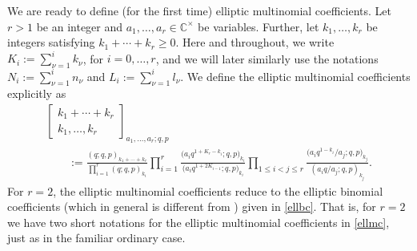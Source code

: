 \documentclass[10pt,a4paper]{amsart}
\numberwithin{equation}{section}
\theoremstyle{definition}
\newcommand{\C}{\mathbb C}
\begin{document}
We are ready to define (for the first time)
elliptic multinomial coefficients.
Let $r>1$ be an integer and $a_1,\dots,a_r\in\C^\times$ be variables.
Further, let $k_1,\dots,k_r$ be integers satisfying $k_1+\cdots+k_r\ge 0$.
Here and throughout, we write $K_i:=\sum_{\nu=1}^i k_\nu$,
for $i=0,\dots,r$, and we will later similarly use the notations
$N_i:=\sum_{\nu=1}^i n_\nu$ and $L_i:=\sum_{\nu=1}^i l_\nu$.
We define the elliptic multinomial coefficients explicitly as
\begin{gather}
\begin{bmatrix}k_1+\cdots+k_r\\k_1,\dots,k_r\end{bmatrix}
_{a_1,\dots,a_r;q,p}\nonumber\\
\qquad:=
\frac{(q;q,p)_{k_1+\cdots+k_r}}{\prod_{i=1}^r(q;q,p)_{k_i}}
\prod_{i=1}^r\frac{\bigl(a_iq^{1+K_r-k_i};q,p\bigr)_{k_i}}
{\bigl(a_iq^{1+2K_{i-1}};q,p\bigr)_{k_i}}
\prod_{1\le i<j\le r}\frac{\bigl(a_iq^{1-k_i}/a_j;q,p\bigr)_{k_j}}
{(a_iq/a_j;q,p)_{k_j}}.\label{ellmc}
\end{gather}
For $r=2$, the elliptic multinomial coefficients
reduce to the elliptic binomial coefficients
(which in general is different from
)
given in \eqref{ellbc}. That is, for $r=2$ we have two short notations for the
elliptic multinomial coefficients in \eqref{ellmc},
just as in the familiar ordinary case.
\end{document}
